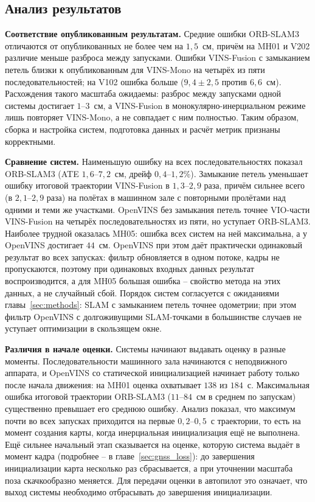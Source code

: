     \subsection{Анализ результатов}

    \textbf{Соответствие опубликованным результатам.}
    Средние ошибки ORB-SLAM3 отличаются от опубликованных не более чем на $1{,}5$~см, причём на MH01 и V202 различие меньше разброса между запусками.
    Ошибки VINS-Fusion с замыканием петель близки к опубликованным для VINS-Mono на четырёх из пяти последовательностей; на V102 ошибка больше ($9{,}4 \pm 2{,}5$ против $6{,}6$~см).
    Расхождения такого масштаба ожидаемы: разброс между запусками одной системы достигает $1$--$3$~см, а VINS-Fusion в монокулярно-инерциальном режиме лишь повторяет VINS-Mono, а не совпадает с ним полностью.
    Таким образом, сборка и настройка систем, подготовка данных и расчёт метрик признаны корректными.

    \textbf{Сравнение систем.}
    Наименьшую ошибку на всех последовательностях показал ORB-SLAM3 (ATE $1{,}6$--$7{,}2$~см, дрейф $0{,}4$--$1{,}2$\%).
    Замыкание петель уменьшает ошибку итоговой траектории VINS-Fusion в $1{,}3$--$2{,}9$ раза, причём сильнее всего (в $2{,}1$--$2{,}9$ раза) на полётах в машинном зале с повторными пролётами над одними и теми же участками.
    OpenVINS без замыкания петель точнее VIO-части VINS-Fusion на четырёх последовательностях из пяти, но уступает ORB-SLAM3.
    Наиболее трудной оказалась MH05: ошибка всех систем на ней максимальна, а у OpenVINS достигает $44$~см.
    OpenVINS при этом даёт практически одинаковый результат во всех запусках: фильтр обновляется в одном потоке, кадры не пропускаются, поэтому при одинаковых входных данных результат воспроизводится, а для MH05 большая ошибка -- свойство метода на этих данных, а не случайный сбой.
    Порядок систем согласуется с ожиданиями главы~\ref{sec:methods}: SLAM с замыканием петель точнее одометрии; при этом фильтр OpenVINS с долгоживущими SLAM-точками в большинстве случаев не уступает оптимизации в скользящем окне.

    \textbf{Различия в начале оценки.}
    Системы начинают выдавать оценку в разные моменты.
    Последовательности машинного зала начинаются с неподвижного аппарата, и OpenVINS со статической инициализацией начинает работу только после начала движения: на MH01 оценка охватывает $138$ из $184$~с.
    Максимальная ошибка итоговой траектории ORB-SLAM3 ($11$--$84$~см в среднем по запускам) существенно превышает его среднюю ошибку.
    Анализ показал, что максимум почти во всех запусках приходится на первые $0{,}2$--$0{,}5$~с траектории, то есть на момент создания карты, когда инерциальная инициализация ещё не выполнена.
    Ещё сильнее начальный этап сказывается на оценке, которую система выдаёт в момент кадра (подробнее -- в главе~\ref{sec:gnss_loss}): до завершения инициализации карта несколько раз сбрасывается, а при уточнении масштаба поза скачкообразно меняется.
    Для передачи оценки в автопилот это означает, что выход системы необходимо отбрасывать до завершения инициализации.

